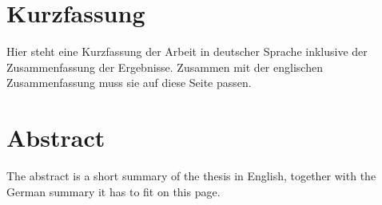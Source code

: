 \thispagestyle{plain}

\section*{Kurzfassung}
Hier steht eine Kurzfassung der Arbeit in deutscher Sprache inklusive der Zusammenfassung der Ergebnisse. 
Zusammen mit der englischen Zusammenfassung muss sie auf diese Seite passen.

\section*{Abstract}
\begin{english}
The abstract is a short summary of the thesis in English, together with the German summary it has to fit on this page.
\end{english}
